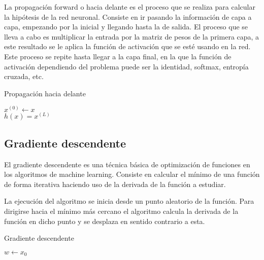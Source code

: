 La propagación forward o hacia delante es el proceso que se realiza para calcular la hipótesis de la red neuronal. Consiste en ir pasando la información de capa a capa, empezando por la inicial y llegando hasta la de salida. El proceso que se lleva a cabo es multiplicar la entrada por la matriz de pesos de la primera capa, a este resultado se le aplica la función de activación que se esté usando en la red. Este proceso se repite hasta llegar a la capa final, en la que la función de activación dependiendo del problema puede ser la identidad, softmax, entropía cruzada, etc.

\begin{algorithm}[H]
   \caption{Propagación hacia delante}
   
   $x^{(0)} \gets x$ \\
   $h(x) = x^{(L)}$
   \label{tab:Feedforward}
\end{algorithm}

\subsection{Gradiente descendente}

El gradiente descendente es una técnica básica de optimización de funciones en los algoritmos de machine learning. Consiste en calcular el mínimo de una función de forma iterativa haciendo uso de la derivada de la función a estudiar. 

La ejecución del algoritmo se inicia desde un punto aleatorio de la función. Para dirigirse hacia el mínimo más cercano el algoritmo calcula la derivada de la función en dicho punto y se desplaza en sentido contrario a esta. 

\begin{algorithm}[H]
   \caption{Gradiente descendente}
   $w \gets x_{0}$\\
\end{algorithm}
